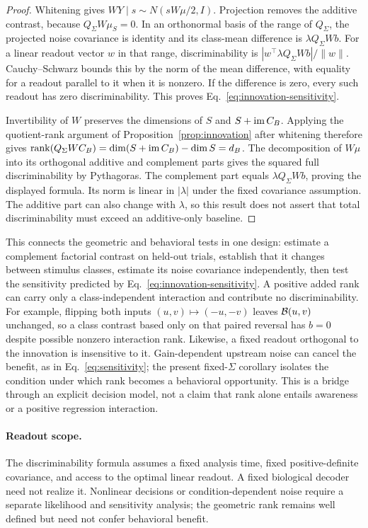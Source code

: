 \begin{proof}
Whitening gives $WY\mid s\sim N(sW\mu/2,I)$. Projection removes the additive contrast, because $Q_\Sigma W\mu_S=0$. In an orthonormal basis of the range of $Q_\Sigma$, the projected noise covariance is identity and its class-mean difference is $\lambda Q_\Sigma Wb$. For a linear readout vector $w$ in that range, discriminability is $|w^\top\lambda Q_\Sigma Wb|/\|w\|$. Cauchy--Schwarz bounds this by the norm of the mean difference, with equality for a readout parallel to it when it is nonzero. If the difference is zero, every such readout has zero discriminability. This proves Eq.~\eqref{eq:innovation-sensitivity}.

Invertibility of $W$ preserves the dimensions of $S$ and $S+\operatorname{im} C_B$. Applying the quotient-rank argument of Proposition~\ref{prop:innovation} after whitening therefore gives $\operatorname{rank}(Q_\Sigma WC_B)=\dim(S+\operatorname{im} C_B)-\dim S=d_B$. The decomposition of $W\mu$ into its orthogonal additive and complement parts gives the squared full discriminability by Pythagoras. The complement part equals $\lambda Q_\Sigma Wb$, proving the displayed formula. Its norm is linear in $|\lambda|$ under the fixed covariance assumption. The additive part can also change with $\lambda$, so this result does not assert that total discriminability must exceed an additive-only baseline.
\end{proof}

This connects the geometric and behavioral tests in one design: estimate a complement factorial contrast on held-out trials, establish that it changes between stimulus classes, estimate its noise covariance independently, then test the sensitivity predicted by Eq.~\eqref{eq:innovation-sensitivity}. A positive added rank can carry only a class-independent interaction and contribute no discriminability. For example, flipping both inputs $(u,v)\mapsto(-u,-v)$ leaves $\mathcal{B}(u,v)$ unchanged, so a class contrast based only on that paired reversal has $b=0$ despite possible nonzero interaction rank. Likewise, a fixed readout orthogonal to the innovation is insensitive to it. Gain-dependent upstream noise can cancel the benefit, as in Eq.~\eqref{eq:sensitivity}; the present fixed-$\Sigma$ corollary isolates the condition under which rank becomes a behavioral opportunity. This is a bridge through an explicit decision model, not a claim that rank alone entails awareness or a positive regression interaction.

\paragraph{Readout scope.} The discriminability formula assumes a fixed analysis time, fixed positive-definite covariance, and access to the optimal linear readout. A fixed biological decoder need not realize it. Nonlinear decisions or condition-dependent noise require a separate likelihood and sensitivity analysis; the geometric rank remains well defined but need not confer behavioral benefit.
